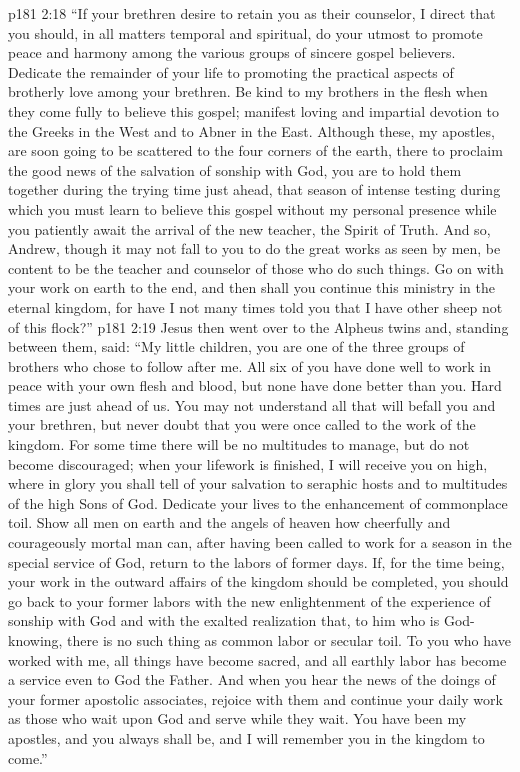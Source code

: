 \vs p181 2:18 \textcolor{ubdarkred}{“If your brethren desire to retain you as their counselor, I direct that you should, in all matters temporal and spiritual, do your utmost to promote peace and harmony among the various groups of sincere gospel believers. Dedicate the remainder of your life to promoting the practical aspects of brotherly love among your brethren. Be kind to my brothers in the flesh when they come fully to believe this gospel; manifest loving and impartial devotion to the Greeks in the West and to Abner in the East. Although these, my apostles, are soon going to be scattered to the four corners of the earth, there to proclaim the good news of the salvation of sonship with God, you are to hold them together during the trying time just ahead, that season of intense testing during which you must learn to believe this gospel without my personal presence while you patiently await the arrival of the new teacher, the Spirit of Truth. And so, Andrew, though it may not fall to you to do the great works as seen by men, be content to be the teacher and counselor of those who do such things. Go on with your work on earth to the end, and then shall you continue this ministry in the eternal kingdom, for have I not many times told you that I have other sheep not of this flock?”}
\pc \vs p181 2:19 Jesus then went over to the Alpheus twins and, standing between them, said: \textcolor{ubdarkred}{“My little children, you are one of the three groups of brothers who chose to follow after me. All six of you have done well to work in peace with your own flesh and blood, but none have done better than you. Hard times are just ahead of us. You may not understand all that will befall you and your brethren, but never doubt that you were once called to the work of the kingdom. For some time there will be no multitudes to manage, but do not become discouraged; when your lifework is finished, I will receive you on high, where in glory you shall tell of your salvation to seraphic hosts and to multitudes of the high Sons of God. Dedicate your lives to the enhancement of commonplace toil. Show all men on earth and the angels of heaven how cheerfully and courageously mortal man can, after having been called to work for a season in the special service of God, return to the labors of former days. If, for the time being, your work in the outward affairs of the kingdom should be completed, you should go back to your former labors with the new enlightenment of the experience of sonship with God and with the exalted realization that, to him who is God\hyp{}knowing, there is no such thing as common labor or secular toil. To you who have worked with me, all things have become sacred, and all earthly labor has become a service even to God the Father. And when you hear the news of the doings of your former apostolic associates, rejoice with them and continue your daily work as those who wait upon God and serve while they wait. You have been my apostles, and you always shall be, and I will remember you in the kingdom to come.”}
